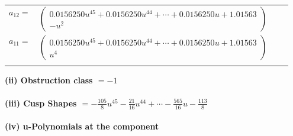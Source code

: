 \documentclass[1p]{elsarticle_modified}
\theoremstyle{definition}
\begin{document}
\begin{tabular}{m{7pt} m{180pt} m{7pt} m{180pt} }
\flushright $a_{12}=$&$\begin{pmatrix}0.0156250 u^{45}+0.0156250 u^{44}+\cdots+0.0156250 u+1.01563\\- u^2\end{pmatrix}$ \\
\flushright $a_{11}=$&$\begin{pmatrix}0.0156250 u^{45}+0.0156250 u^{44}+\cdots+0.0156250 u+1.01563\\u^4\end{pmatrix}$\\&\end{tabular}
\flushleft \textbf{(ii) Obstruction class $= -1$}\\~\\
\flushleft \textbf{(iii) Cusp Shapes $= -\frac{105}{8} u^{45}-\frac{21}{16} u^{44}+\cdots-\frac{565}{16} u-\frac{113}{8}$}\\~\\
\newpage\renewcommand{\arraystretch}{1}
\flushleft \textbf{(iv) u-Polynomials at the component}\newline \\
\end{document}
